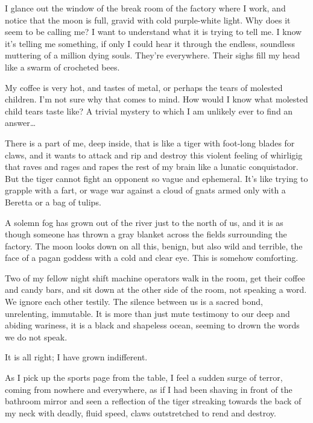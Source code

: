 I glance out the window of the break room of the factory where I
work, and notice that the moon is full, gravid with cold
purple-white light. Why does it seem to be calling me? I want to
understand what it is trying to tell me. I know it's telling
me something, if only I could hear it through the endless,
soundless muttering of a million dying souls. They're everywhere.
Their sighs fill my head like a swarm of crocheted bees.



My coffee is very hot, and tastes of metal, or perhaps the tears of
molested children. I'm not sure why that comes to mind. How
would I know what molested child tears taste like? A trivial
mystery to which I am unlikely ever to find an answer{\ldots}



There is a part of me, deep inside, that is like a tiger with
foot-long blades for claws, and it wants to attack and rip and
destroy this violent feeling of whirligig that raves and rages and
rapes the rest of my brain like a lunatic conquistador. But the
tiger cannot fight an opponent so vague and ephemeral. It's
like trying to grapple with a fart, or wage war against a cloud of
gnats armed only with a Beretta or a bag of tulips.



A solemn fog has grown out of the river just to the north of us,
and it is as though someone has thrown a gray blanket across the
fields surrounding the factory. The moon looks down on all this,
benign, but also wild and terrible, the face of a pagan goddess
with a cold and clear eye. This is somehow comforting.



Two of my fellow night shift machine operators walk in the room,
get their coffee and candy bars, and sit down at the other side of
the room, not speaking a word. We ignore each other testily. The
silence between us is a sacred bond, unrelenting, immutable. It is
more than just mute testimony to our deep and abiding wariness, it
is a black and shapeless ocean, seeming to drown the words we do
not speak.



It is all right; I have grown indifferent.



As I pick up the sports page from the table, I feel a sudden surge
of terror, coming from nowhere and everywhere, as if I had been
shaving in front of the bathroom mirror and seen a reflection of
the tiger streaking towards the back of my neck with deadly, fluid
speed, claws outstretched to rend and destroy.



